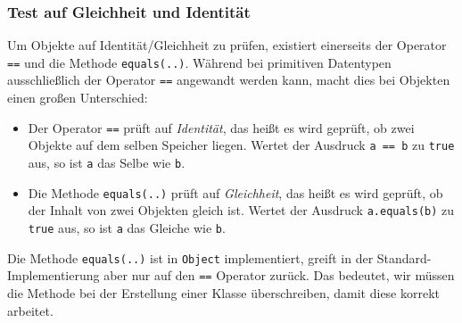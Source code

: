 	\subsubsection{Test auf Gleichheit und Identität}
		\label{sec:equals_identity}
	
		Um Objekte auf Identität/Gleichheit zu prüfen, existiert einerseits der Operator \lstinline|==| und die Methode \lstinline|equals(..)|. Während bei primitiven Datentypen ausschließlich der Operator \lstinline|==| angewandt werden kann, macht dies bei Objekten einen großen Unterschied:
		\begin{itemize}
			\item Der Operator \lstinline|==| prüft auf \textit{Identität}, das heißt es wird geprüft, ob zwei Objekte auf dem selben Speicher liegen. Wertet der Ausdruck \lstinline|a == b| zu \lstinline|true| aus, so ist \lstinline|a| das Selbe wie \lstinline|b|.
			\item Die Methode \lstinline|equals(..)| prüft auf \textit{Gleichheit}, das heißt es wird geprüft, ob der Inhalt von zwei Objekten gleich ist. Wertet der Ausdruck \lstinline|a.equals(b)| zu \lstinline|true| aus, so ist \lstinline|a| das Gleiche wie \lstinline|b|.
		\end{itemize}
	
		
		Die Methode \lstinline|equals(..)| ist in \lstinline|Object| implementiert, greift in der Standard-Implementierung aber nur auf den \lstinline|==| Operator zurück. Das bedeutet, wir müssen die Methode bei der Erstellung einer Klasse überschreiben, damit diese korrekt arbeitet.
		
